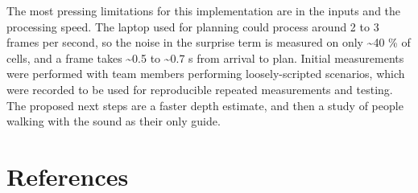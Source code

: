 \documentclass[a4paper]{article}
\begin{document}
The most pressing limitations for this implementation are in the inputs and the processing speed. The laptop used for planning could process around 2 to 3 frames per second, so the noise in the surprise term is measured on only \textasciitilde 40 \% of cells, and a frame takes \textasciitilde 0.5 to \textasciitilde 0.7 s from arrival to plan. Initial measurements were performed with team members performing loosely-scripted scenarios, which were recorded to be used for reproducible repeated measurements and testing. The proposed next steps are a faster depth estimate, and then a study of people walking with the sound as their only guide.

\section{References} \label{references}
\end{document}
